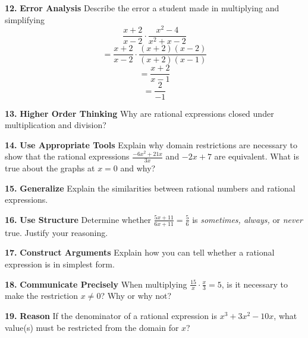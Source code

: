 \documentclass{article}
\newenvironment{practice}[2]{\textbf{#1.}}{\vspace{1em}}
\newcommand{\answer}[1]{}
\newcommand{\uncertain}[2]{#1}
\begin{document}
\begin{practice}{12}{\uncertain{?}{missing DOK}}
\textbf{Error Analysis} Describe the error a student made in multiplying and simplifying
$$ \frac{x+2}{x-2} \cdot \frac{x^2-4}{x^2+x-2} $$
$$ = \frac{x+2}{x-2} \cdot \frac{(x+2)(x-2)}{(x+2)(x-1)} $$
$$ = \frac{x+2}{x-1} $$
$$ = \frac{2}{-1} $$
\answer{}
\end{practice}

\begin{practice}{13}{\uncertain{?}{missing DOK}}
\textbf{Higher Order Thinking} Why are rational expressions closed under multiplication and division?
\answer{}
\end{practice}

\begin{practice}{14}{\uncertain{?}{missing DOK}}
\textbf{Use Appropriate Tools} Explain why domain restrictions are necessary to show that the rational expressions $\frac{-6x^2+21x}{3x}$ and $-2x+7$ are equivalent. What is true about the graphs at $x = 0$ and why?
\answer{}
\end{practice}

\begin{practice}{15}{\uncertain{?}{missing DOK}}
\textbf{Generalize} Explain the similarities between rational numbers and rational expressions.
\answer{}
\end{practice}

\begin{practice}{16}{\uncertain{?}{missing DOK}}
\textbf{Use Structure} Determine whether $\frac{5x+11}{6x+11} = \frac{5}{6}$ is \textit{sometimes, always,} or \textit{never} true. Justify your reasoning.
\answer{}
\end{practice}

\begin{practice}{17}{\uncertain{?}{missing DOK}}
\textbf{Construct Arguments} Explain how you can tell whether a rational expression is in simplest form.
\answer{}
\end{practice}

\begin{practice}{18}{\uncertain{?}{missing DOK}}
\textbf{Communicate Precisely} When multiplying $\frac{15}{x} \cdot \frac{x}{3} = 5$, is it necessary to make the restriction $x \neq 0$? Why or why not?
\answer{}
\end{practice}

\begin{practice}{19}{\uncertain{?}{missing DOK}}
\textbf{Reason} If the denominator of a rational expression is $x^3+3x^2-10x$, what value(s) must be restricted from the domain for $x$?
\answer{}
\end{practice}
\end{document}
